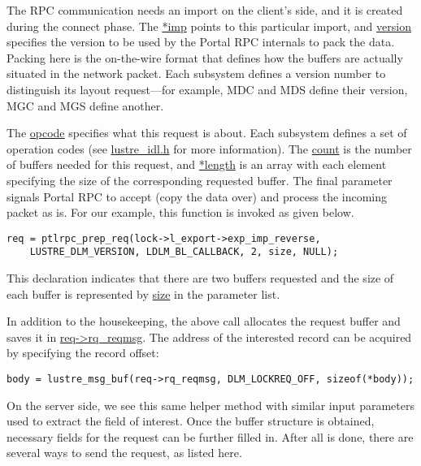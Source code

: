The RPC communication needs an import on the client's side, and it is created
during the connect phase. The \url{*imp} points to this particular import, and
\url{version} specifies the version to be used by the Portal RPC internals to
pack the data. Packing here is the  on-the-wire format that defines how the
buffers are actually situated in the network packet. Each subsystem defines a
version number to distinguish its layout request---for example, MDC and MDS
define their version, MGC and MGS define another. 

The \url{opcode} specifies what this request is about. Each subsystem defines
a set of operation codes (see \url{lustre_idl.h} for more information).
The \url{count} is the number of buffers needed for this request, and
\url{*length} is an array with each element specifying the size of the
corresponding requested buffer.  The final parameter signals Portal RPC to
accept (copy the data over) and process the incoming packet as is.  For our
example, this function is invoked as given below.

\begin{Verbatim}
req = ptlrpc_prep_req(lock->l_export->exp_imp_reverse,
    LUSTRE_DLM_VERSION, LDLM_BL_CALLBACK, 2, size, NULL);
\end{Verbatim}

This declaration indicates that there are two buffers requested and the size of
each buffer is represented by \url{size} in the parameter list.

In addition to the housekeeping, the above call allocates the request buffer and
saves it in  \url{req->rq_reqmsg}.  The address of the interested record can be
acquired by specifying the record offset:

\begin{Verbatim}
body = lustre_msg_buf(req->rq_reqmsg, DLM_LOCKREQ_OFF, sizeof(*body)); 
\end{Verbatim}

On the server side, we see this same helper method with similar input parameters
used to extract the field of interest. Once the buffer structure is obtained,
necessary fields for the request can be further filled in. After all is done,
there are several ways to send the request, as listed here.

